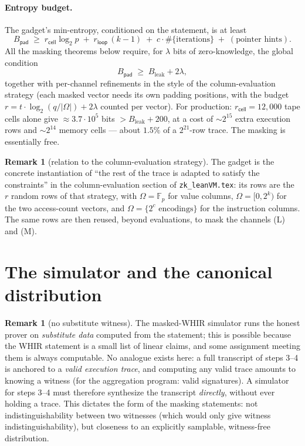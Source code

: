 \documentclass{article}
\newcommand{\Fp}{\mathbb{F}_p}
\theoremstyle{definition}
\newtheorem{remark}[theorem]{Remark}
\begin{document}
\paragraph{Entropy budget.} The gadget's min-entropy, conditioned on the statement, is at least
\[
B_{\mathsf{pad}} \;\geq\; r_{\mathsf{cell}} \log_2 p \;+\; r_{\mathsf{loop}} \,(k - 1) \;+\; c \cdot \#\{\text{iterations}\} \;+\; (\text{pointer hints}) .
\]
All the masking theorems below require, for $\lambda$ bits of zero-knowledge, the global condition
\begin{equation}\label{eq:budget}
B_{\mathsf{pad}} \;\geq\; B_{\mathrm{leak}} + 2\lambda ,
\end{equation}
together with per-channel refinements in the style of the column-evaluation strategy (each masked vector needs its own padding positions, with the budget $r = t \cdot \log_2(q/|\Omega|) + 2\lambda$ counted per vector). For production: $r_{\mathsf{cell}} = 12{,}000$ tape cells alone give $\approx 3.7 \cdot 10^5$ bits $> B_{\mathrm{leak}} + 200$, at a cost of $\sim 2^{15}$ extra execution rows and $\sim 2^{14}$ memory cells --- about $1.5\%$ of a $2^{21}$-row trace. The masking is essentially free.

\begin{remark}[relation to the column-evaluation strategy]
The gadget is the concrete instantiation of ``the rest of the trace is adapted to satisfy the constraints'' in the column-evaluation section of \texttt{zk\_leanVM.tex}: its rows are the $r$ random rows of that strategy, with $\Omega = \Fp$ for value columns, $\Omega = [0, 2^k)$ for the two access-count vectors, and $\Omega = \{2^c \text{ encodings}\}$ for the instruction columns. The same rows are then reused, beyond evaluations, to mask the channels (L) and (M).
\end{remark}

\section{The simulator and the canonical distribution}\label{sec:simulator}

\begin{remark}[no substitute witness]\label{rem:no-substitute}
The masked-WHIR simulator runs the honest prover on \emph{substitute data} computed from the statement; this is possible because the WHIR statement is a small list of linear claims, and some assignment meeting them is always computable. No analogue exists here: a full transcript of steps 3--4 is anchored to a \emph{valid execution trace}, and computing any valid trace amounts to knowing a witness (for the aggregation program: valid signatures). A simulator for steps 3--4 must therefore synthesize the transcript \emph{directly}, without ever holding a trace. This dictates the form of the masking statements: not indistinguishability between two witnesses (which would only give witness indistinguishability), but closeness to an explicitly samplable, witness-free distribution.
\end{remark}
\end{document}
